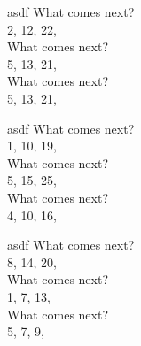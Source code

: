 \documentclass[letter, grid,frame,backs]{flashcards}
\begin{document}
\begin{flashcard}{asdf}
\Huge
\center
\vspace*{-0.8in}
What comes next? \\
\vspace*{-0.3in}
2, 12, 22, \underline{\hspace{1.5cm}} \\
What comes next? \\
\vspace*{-0.3in}
5, 13, 21, \underline{\hspace{1.5cm}} \\
What comes next? \\
\vspace*{-0.3in}
5, 13, 21, \underline{\hspace{1.5cm}} \\

\end{flashcard}
\begin{flashcard}{asdf}
\Huge
\center
\vspace*{-0.8in}
What comes next? \\
\vspace*{-0.3in}
1, 10, 19, \underline{\hspace{1.5cm}} \\
What comes next? \\
\vspace*{-0.3in}
5, 15, 25, \underline{\hspace{1.5cm}} \\
What comes next? \\
\vspace*{-0.3in}
4, 10, 16, \underline{\hspace{1.5cm}} \\

\end{flashcard}
\begin{flashcard}{asdf}
\Huge
\center
\vspace*{-0.8in}
What comes next? \\
\vspace*{-0.3in}
8, 14, 20, \underline{\hspace{1.5cm}} \\
What comes next? \\
\vspace*{-0.3in}
1, 7, 13, \underline{\hspace{1.5cm}} \\
What comes next? \\
\vspace*{-0.3in}
5, 7, 9, \underline{\hspace{1.5cm}} \\

\end{flashcard}
\end{document}
